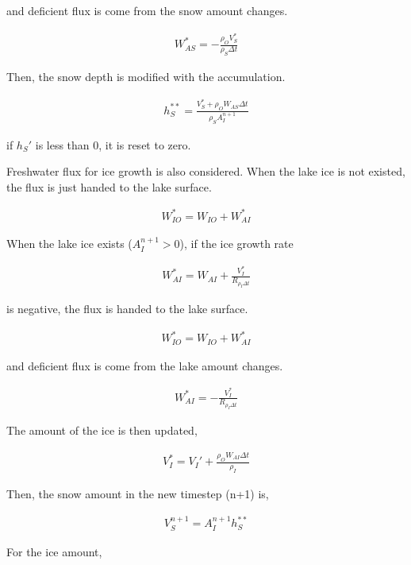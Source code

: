and deficient flux is come from the snow amount changes.

\begin{eqnarray}
    W_{AS}^* = - \frac{\rho_O V_S^{*}}{\rho_S \Delta t}
\end{eqnarray}

Then, the snow depth is modified with the accumulation.

\begin{eqnarray}
    h_S^{**} = \frac{V_S^{*}+ \rho_O W_{AS} \Delta t}{\rho_S {A_I^{n+1}}}
\end{eqnarray}

if \(h_S'\) is less than 0, it is reset to zero.

Freshwater flux for ice growth is also considered. When the lake ice is
not existed, the flux is just handed to the lake surface.

\begin{eqnarray}
    W_{IO}^* = W_{IO} + W_{AI}^*
\end{eqnarray}

When the lake ice exists (\(A_I^{n+1}>0\)), if the ice growth rate

\begin{eqnarray}
    W_{AI}^* = W_{AI} + \frac{V_I^{*}}{R_{\rho_I \Delta t}}
\end{eqnarray}

is negative, the flux is handed to the lake surface.

\begin{eqnarray}
        W_{IO}^* = W_{IO} + W_{AI}^*
\end{eqnarray}

and deficient flux is come from the lake amount changes.

\begin{eqnarray}
    W_{AI}^* = - \frac{V_I^{*}}{R_{\rho_I \Delta t}}
\end{eqnarray}

The amount of the ice is then updated,

\begin{eqnarray}
    V_I^* = V_I' + \frac{\rho_O W_{AI}\Delta t}{\rho_I}
\end{eqnarray}

Then, the snow amount in the new timestep (n+1) is,

\begin{eqnarray}
    V_S^{n+1} = A_I^{n+1} h_S^{**}
\end{eqnarray}

For the ice amount,

